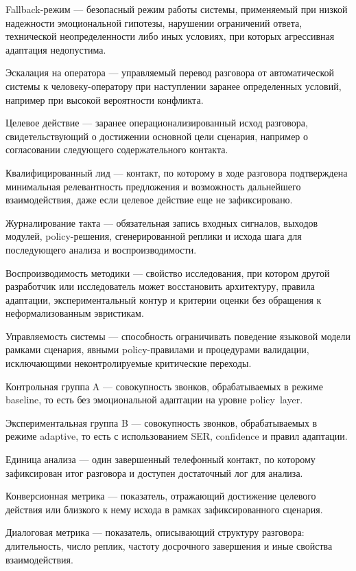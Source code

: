 \documentclass[a4paper,14pt]{extarticle}
\renewcommand{\texttt}[1]{\textnormal{#1}}
\begin{document}
Fallback-режим --- безопасный режим работы системы, применяемый при
низкой надежности эмоциональной гипотезы, нарушении ограничений ответа,
технической неопределенности либо иных условиях, при которых агрессивная
адаптация недопустима.

Эскалация на оператора --- управляемый перевод разговора от
автоматической системы к человеку-оператору при наступлении заранее
определенных условий, например при высокой вероятности конфликта.

Целевое действие --- заранее операционализированный исход разговора,
свидетельствующий о достижении основной цели сценария, например о
согласовании следующего содержательного контакта.

Квалифицированный лид --- контакт, по которому в ходе разговора
подтверждена минимальная релевантность предложения и возможность
дальнейшего взаимодействия, даже если целевое действие еще не
зафиксировано.

Журналирование такта --- обязательная запись входных сигналов, выходов
модулей, policy-решения, сгенерированной реплики и исхода шага для
последующего анализа и воспроизводимости.

Воспроизводимость методики --- свойство исследования, при котором другой
разработчик или исследователь может восстановить архитектуру, правила
адаптации, экспериментальный контур и критерии оценки без обращения к
неформализованным эвристикам.

Управляемость системы --- способность ограничивать поведение языковой
модели рамками сценария, явными policy-правилами и процедурами
валидации, исключающими неконтролируемые критические переходы.

Контрольная группа \texttt{A} --- совокупность звонков, обрабатываемых в
режиме \texttt{baseline}, то есть без эмоциональной адаптации на уровне
\texttt{policy\ layer}.

Экспериментальная группа \texttt{B} --- совокупность звонков,
обрабатываемых в режиме \texttt{adaptive}, то есть с использованием
\texttt{SER}, \texttt{confidence} и правил адаптации.

Единица анализа --- один завершенный телефонный контакт, по которому
зафиксирован итог разговора и доступен достаточный лог для анализа.

Конверсионная метрика --- показатель, отражающий достижение целевого
действия или близкого к нему исхода в рамках зафиксированного сценария.

Диалоговая метрика --- показатель, описывающий структуру разговора:
длительность, число реплик, частоту досрочного завершения и иные
свойства взаимодействия.
\end{document}
